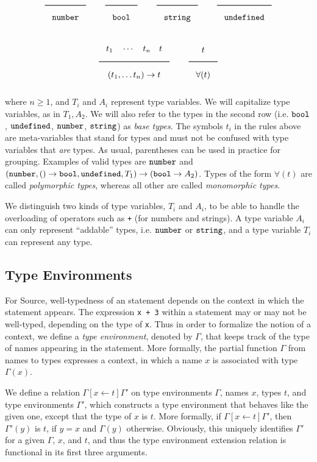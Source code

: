 \[
\Rule{}{\Number}
\qquad
\Rule{}{\Bool}
\qquad
\Rule{}{\String}
\qquad
\Rule{}{\Undefined}
\]

\[ \Rule{t_1 \quad \cdots\quad t_n\quad t}{(t_1, \ldots t_n) \rightarrow t}
\qquad
\Rule{t}{\forall ( t )} \]

\noindent
where $n \geq 1$, and $T_i$ and $A_i$ represent type variables. We will capitalize 
type variables, as in $T_1, A_2$. We will also refer to the types in the second row (i.e. $\texttt{bool}$,
$\texttt{undefined}$, $\texttt{number}$, $\texttt{string}$) as \emph{base types}. The symbols $t_i$ in the rules above
are meta-variables that stand for types and must not be confused with type variables
that \emph{are} types.
As usual, parentheses can be used in practice for grouping.
Examples of valid types are $\texttt{number}$ and
$(\texttt{number}, () \rightarrow \texttt{bool}, \texttt{undefined}, T_1) \rightarrow (\texttt{bool} \rightarrow A_2)$.
Types of the form $\forall ( t )$ are called \emph{polymorphic types}, whereas
all other are called \emph{monomorphic types}.

We distinguish two kinds of type variables, $T_i$ and $A_i$, to be able to handle
the overloading of operators such as \texttt{+} (for numbers and strings).
A type variable $A_i$ can only
represent ``addable'' types, i.e. 
$\texttt{number}$ or $\texttt{string}$, and
a type variable $T_i$ can represent any type.

\subsection{Type Environments}

For Source, well-typedness of an statement depends on the context in which the
statement appears. The expression \verb#x + 3# within a statement may or may 
not be well-typed, depending on the type of \verb#x#. Thus in order 
to formalize the notion of a context, we define a 
\emph{type environment}, denoted by $\Gamma$, that keeps track
of the type of names appearing in the statement. More
formally,
the partial function $\Gamma$ from names to types expresses a 
context, in which a name $x$ is associated with type $\Gamma(x)$. 

We define a relation $\Gamma[x \leftarrow t]\Gamma'$ on type environments 
$\Gamma$, names $x$, types $t$, and type environments $\Gamma'$,
which constructs a type environment that behaves like the 
given one, except that the type of $x$ is $t$. More formally, 
if $\Gamma[x \leftarrow t]\Gamma'$, then $\Gamma'(y)$ is $t$, 
if $y=x$ and $\Gamma(y)$ 
otherwise. Obviously, this uniquely identifies $\Gamma'$ for
a given $\Gamma$, $x$, and $t$, and thus the type environment extension
relation is functional in its first three arguments.

